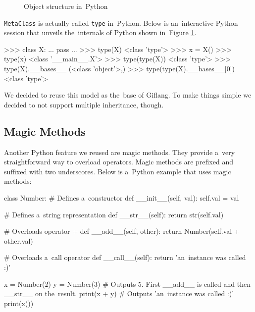 \begin{figure}[!hbt]
{
    }
    \caption{Object structure in~Python}
	\label{fig:chap3:python_structure}
\end{figure}

\texttt{MetaClass} is actually called \texttt{type} in~Python. Below is an~interactive Python session that unveils the~internals of Python shown
in~Figure \ref{fig:chap3:python_structure}.
\begin{code}
>>> class X:
...     pass
... 
>>> type(X)
<class 'type'>
>>> x = X()
>>> type(x)
<class '__main__.X'>
>>> type(type(X))
<class 'type'>
>>> type(X).__bases__
(<class 'object'>,)
>>> type(type(X).__bases__[0])
<class 'type'>
\end{code}

We decided to reuse this model as the~base of Giflang. To make things simple we decided to not support multiple inheritance, though.

\subsection{Magic Methods}
Another Python feature we reused are magic methods. They provide a~very straightforward way
to overload operators. Magic methods are prefixed and suffixed with two underscores. Below is a~Python example that uses magic methods:
\begin{code}
class Number:
    # Defines a~constructor
    def __init__(self, val):
        self.val = val
    
    # Defines a~string representation
    def __str__(self):
        return str(self.val)

    # Overloads operator +
    def __add__(self, other):
        return Number(self.val + other.val)

    # Overloads a~call operator
    def __call__(self):
        return 'an~instance was called :)'

x = Number(2)
y = Number(3)
# Outputs 5. First __add__ is called and then __str__ on the~result.
print(x + y)
# Outputs 'an~instance was called :)'
print(x())
\end{code}

